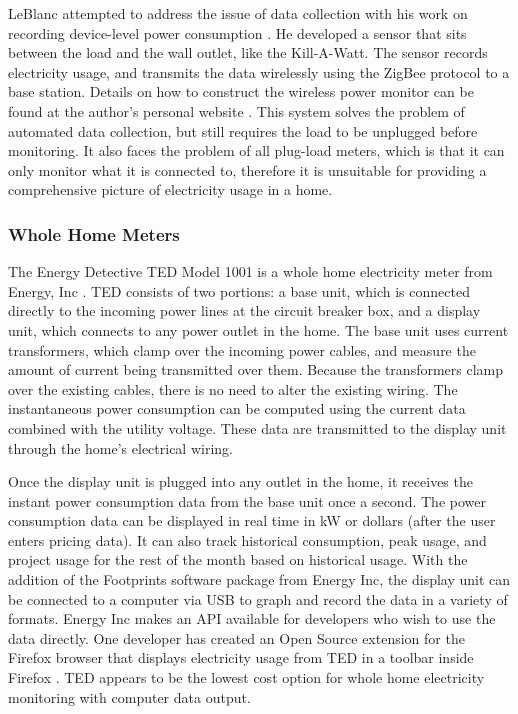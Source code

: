 LeBlanc attempted to address the issue of data collection with his work on recording device-level power consumption \cite{leblanc-2007}. He developed a sensor that sits between the load and the wall outlet, like the Kill-A-Watt. The sensor records electricity usage, and transmits the data wirelessly using the ZigBee protocol to a base station. Details on how to construct the wireless power monitor can be found at the author's personal website \cite{LeBlanc2008power-mon-howto}. This system solves the problem of automated data collection, but still requires the load to be unplugged before monitoring. It also faces the problem of all plug-load meters, which is that it can only monitor what it is connected to, therefore it is unsuitable for providing a comprehensive picture of electricity usage in a home.

\subsubsection{Whole Home Meters}
\label{sec:whole-home-meters}

The Energy Detective TED Model 1001 is a whole home electricity meter from Energy, Inc \cite{the-energy-detective}. TED consists of two portions: a base unit, which is connected directly to the incoming power lines at the circuit breaker box, and a display unit, which connects to any power outlet in the home. The base unit uses current transformers, which clamp over the incoming power cables, and measure the amount of current being transmitted over them. Because the transformers clamp over the existing cables, there is no need to alter the existing wiring. The instantaneous power consumption can be computed using the current data combined with the utility voltage. These data are transmitted to the display unit through the home's electrical wiring.

Once the display unit is plugged into any outlet in the home, it receives the instant power consumption data from the base unit once a second. The power consumption data can be displayed in real time in kW or dollars (after the user enters pricing data). It can also track historical consumption, peak usage, and project usage for the rest of the month based on historical usage. With the addition of the Footprints software package from Energy Inc, the display unit can be connected to a computer via USB to graph and record the data in a variety of formats. Energy Inc makes an API available for developers who wish to use the data directly. One developer has created an Open Source extension for the Firefox browser that displays electricity usage from TED in a toolbar inside Firefox \cite{Nick2008TED-the-Toolbar}. TED appears to be the lowest cost option for whole home electricity monitoring with computer data output.

